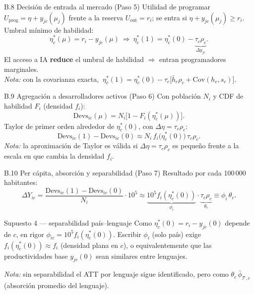 \documentclass[10pt,aspectratio=169]{beamer}
\begin{document}
\begin{frame}{B.8 Decisión de entrada al mercado (Paso 5)}
\small
Utilidad de programar $U_{\mathrm{prog}}=\eta+y_{jc}(\mu_j)$ frente a la reserva $U_{\mathrm{out}}=r_i$; se entra si $\eta+y_{jc}(\mu_j)\ge r_i$. Umbral mínimo de habilidad:
\[
\eta^*_c(\mu)=r_i-y_{jc}(\mu)\ \Longrightarrow\ \eta^*_c(1)=\eta^*_c(0)-\underbrace{\tau_c\rho_c}_{\Delta y_{jc}}.
\]
El acceso a IA \textbf{reduce} el umbral de habilidad $\Rightarrow$ entran programadores marginales.
\smallskip\\
{\footnotesize\textit{Nota:} con la covarianza exacta, $\ \eta^*_c(1)=\eta^*_c(0)-\tau_c\bigl[\bar h_c\rho_c+\mathrm{Cov}(h_c,s_c)\bigr]$.}
\end{frame}

\begin{frame}{B.9 Agregación a desarrolladores activos (Paso 6)}
\small
Con población $N_i$ y CDF de habilidad $F_i$ (densidad $f_i$):
\[
\mathrm{Devs}_{ic}(\mu)=N_i\bigl[1-F_i(\eta^*_c(\mu))\bigr].
\]
Taylor de primer orden alrededor de $\eta^*_c(0)$, con $\Delta\eta=\tau_c\rho_c$:
\[
\mathrm{Devs}_{ic}(1)-\mathrm{Devs}_{ic}(0)\approx N_i\,f_i\!\bigl(\eta^*_c(0)\bigr)\,\tau_c\rho_c.
\]
\medskip
{\footnotesize\textit{Nota:} la aproximación de Taylor es válida si $\Delta\eta=\tau_c\rho_c$ es pequeño frente a la escala en que cambia la densidad $f_i$.}
\end{frame}

\begin{frame}{B.10 Per cápita, absorción y separabilidad (Paso 7)}
\small
Resultado por cada 100\,000 habitantes:
\[
\Delta Y_{ic}=\frac{\mathrm{Devs}_{ic}(1)-\mathrm{Devs}_{ic}(0)}{N_i}\cdot10^5
\approx \underbrace{10^5 f_i(\eta^*_c(0))}_{\phi_i}\cdot\underbrace{\tau_c\rho_c}_{\theta_c}\equiv\phi_i\,\theta_c.
\]
\begin{alertblock}{\small Supuesto 4 --- separabilidad país--lenguaje}
\footnotesize Como $\eta^*_c(0)=r_i-y_{jc}(0)$ depende de $c$, en rigor $\phi_{ic}=10^5 f_i(\eta^*_c(0))$. Escribir $\phi_i$ (solo país) exige $f_i(\eta^*_c(0))\approx f_i$ (densidad plana en $c$), o equivalentemente que las productividades base $y_{jc}(0)$ sean similares entre lenguajes.
\end{alertblock}
{\footnotesize\textit{Nota:} sin separabilidad el ATT por lenguaje sigue identificado, pero como $\theta_c\,\bar\phi_{\mathcal{T},c}$ (absorción promedio del lenguaje).}
\end{frame}
\end{document}
